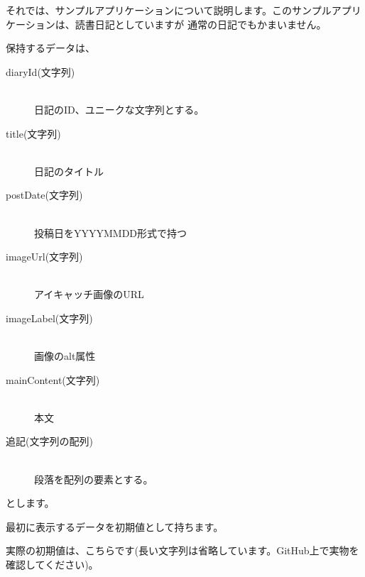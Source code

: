 それでは、サンプルアプリケーションについて説明します。このサンプルアプリケーションは、読書日記としていますが
通常の日記でもかまいません。

\vspace*{\baselineskip}

保持するデータは、\\[0pt]

\begin{description}
\item[diaryId(文字列)] \mbox{} \\
日記のID、ユニークな文字列とする。
\item[title(文字列)] \mbox{} \\
日記のタイトル
\item[postDate(文字列)] \mbox{} \\
投稿日をYYYYMMDD形式で持つ
\item[imageUrl(文字列)] \mbox{} \\
アイキャッチ画像のURL
\item[imageLabel(文字列)] \mbox{} \\
画像のalt属性
\item[mainContent(文字列)] \mbox{} \\
本文
\item[追記(文字列の配列)] \mbox{} \\
段落を配列の要素とする。
\end{description}

とします。

\vspace*{\baselineskip}

最初に表示するデータを初期値として持ちます。

実際の初期値は、こちらです(長い文字列は省略しています。GitHub上で実物を確認してください)。

